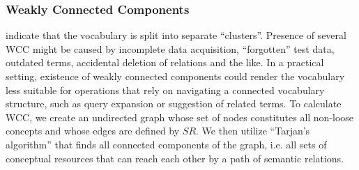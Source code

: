 
\subsubsection{Weakly Connected Components} indicate that the vocabulary is split into separate ``clusters''. Presence of several WCC might be caused by incomplete data acquisition, ``forgotten'' test data, outdated terms, accidental deletion of relations and the like. In a practical setting, existence of weakly connected components could render the vocabulary less suitable for operations that rely on navigating a connected vocabulary structure, such as query expansion or suggestion of related terms. To calculate WCC, we create an undirected graph whose set of nodes constitutes all non-loose concepts and whose edges are defined by $SR$. We then utilize ``Tarjan’s algorithm''\cite{Hopcroft1973} that finds all connected components of the graph, i.e. all sets of conceptual resources that can reach each other by a path of semantic relations.

 

